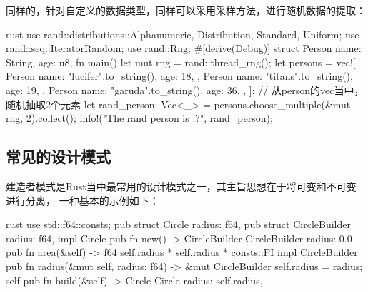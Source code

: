 同样的，针对自定义的数据类型，同样可以采用采样方法，进行随机数据的提取：
\begin{code-block}{rust}
use rand::distributions::{Alphanumeric, Distribution, Standard, Uniform};
use rand::seq::IteratorRandom;
use rand::Rng;
#[derive(Debug)]
struct Person {
    name: String,
    age: u8,
}
fn main() {
    let mut rng = rand::thread_rng();
    let persons = vec![
        Person {
            name: "lucifer".to_string(),
            age: 18,
        },
        Person {
            name: "titans".to_string(),
            age: 19,
        },
        Person {
            name: "garuda".to_string(),
            age: 36,
        },
    ];
    // 从person的vec当中，随机抽取2个元素
    let rand_person: Vec<_> = persons.choose_multiple(&mut rng, 2).collect();
    info!("The rand person is {:?}", rand_person);
}
\end{code-block}

\subsection{常见的设计模式}
建造者模式是Rust当中最常用的设计模式之一，其主旨思想在于将可变和不可变进行分离，
一种基本的示例如下：
\begin{code-block}{rust}
use std::f64::consts;
pub struct Circle {
    radius: f64,
}
pub struct CircleBuilder {
    radius: f64,
}
impl Circle {
    pub fn new() -> CircleBuilder {
        CircleBuilder { radius: 0.0 }
    }
    pub fn area(&self) -> f64 {
        self.radius * self.radius * consts::PI
    }
}
impl CircleBuilder {
    pub fn radius(&mut self, radius: f64) -> &mut CircleBuilder {
        self.radius = radius;
        self
    }
    pub fn build(&self) -> Circle {
        Circle {
            radius: self.radius,
        }
    }
}
\end{code-block}


